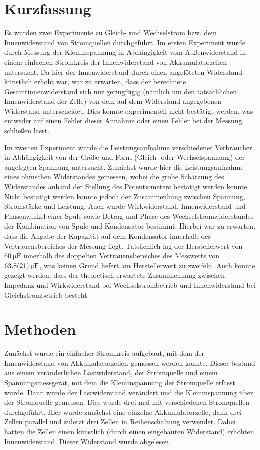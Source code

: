 \documentclass[
	a4paper,
	12pt,
	pagesize,
	ngerman
]{scrartcl}
\begin{document}
	\section{Kurzfassung}
	Es wurden zwei Experimente zu Gleich- und Wechselstrom bzw. dem Innenwiderstand von Stromquellen durchgeführt.
	Im ersten Experiment wurde durch Messung der Klemmspannung in Abhängigkeit vom Außenwiderstand in einem einfachen Stromkreis der Innenwiderstand von Akkumulatorzellen untersucht.
	Da hier der Innenwiderstand durch einen angelöteten Widerstand künstlich erhöht war, war zu erwarten, dass der berechnete Gesamtinnenwiderstand sich nur geringfügig (nämlich um den tatsächlichen Innenwiderstand der Zelle) von dem auf dem Widerstand angegebenen Widerstand unterscheidet.
	Dies konnte experimentell nicht bestätigt werden, was entweder auf einen Fehler dieser Annahme oder einen Fehler bei der Messung schließen lässt.
	\par 
	Im zweiten Experiment wurde die Leistungsaufnahme verschiedener Verbraucher in Abhängigkeit von der Größe und Form (Gleich- oder Wechselspannung) der angelegten Spannung untersucht.
	Zunächst wurde hier die Leistungsaufnahme eines ohmschen Widerstandes gemessen, wobei die grobe Schätzung des Widerstandes anhand der Stellung des Potentiometers bestätigt werden konnte.
	Nicht bestätigt werden konnte jedoch der Zusammenhang zwischen Spannung, Stromstärke und Leistung.
	Auch wurde Wirkwiderstand, Innenwiderstand und Phasenwinkel einer Spule sowie Betrag und Phase des Wechselstromwiderstandes der Kombination von Spule und Kondensator bestimmt.
	Hierbei war zu erwarten, dass die Angabe der Kapazität auf dem Kondensator innerhalb des Vertrauensbereiches der Messung liegt.
	Tatsächlich lag der Herstellerwert von $ \SI{60}{\micro \farad} $ innerhalb des doppelten Vertrauensbereiches des Messwerts von $ \SI{63,8 \pm 2,1}{\micro \farad} $, was keinen Grund liefert am Herstellerwert zu zweifeln.
	Auch konnte gezeigt werden, dass der theoretisch erwartete Zusammenhang zwischen Impedanz und Wirkwiderstand bei Wechselstrombetrieb und Innenwiderstand bei Gleichstrombetrieb besteht.
	
	\section{Methoden}
	Zunächst wurde ein einfacher Stromkreis aufgebaut, mit dem der Innenwiderstand von Akkumulatorzellen gemessen werden konnte.
	Dieser bestand aus einem veränderlichen Lastwiderstand, der Stromquelle und einem Spannungsmessgerät, mit dem die Klemmspannung der Stromquelle erfasst wurde.
	Dann wurde der Lastwiderstand verändert und die Klemmspannung über der Stromquelle gemessen.
	Dies wurde drei mal mit verschiedenen Stromquellen durchgeführt.
	Hier wurde zunächst eine einzelne Akkumulatorzelle, dann drei Zellen parallel und zuletzt drei Zellen in Reihenschaltung verwendet.
	Dabei hatten die Zellen einen künstlich (durch einen eingebauten Widerstand) erhöhten Innenwiderstand.
	Dieser Widerstand wurde abgelesen.
	\par
	
\end{document}

